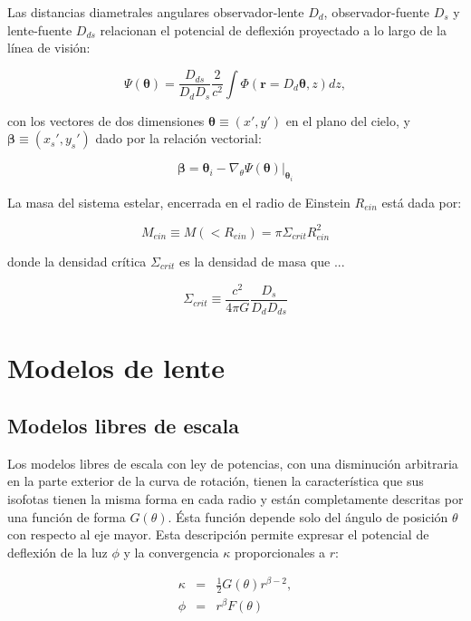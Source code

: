 Las distancias diametrales angulares observador-lente $D_d$, observador-fuente $D_s$ y lente-fuente $D_{ds}$ relacionan el potencial de deflexión proyectado a lo largo de la línea de visión:

\begin{equation}
\Psi ( \bm{\theta}) = \frac{D_{ds}}{D_{d} D_{s}} \frac{2}{c^2} \int \Phi ( \bm{r} = D_d \bm{\theta}, z) dz,
\end{equation}

con los vectores de dos dimensiones $\bm{\theta} \equiv (x', y')$ en el plano del cielo, y $\bm{\beta} \equiv (x_s', y_s')$ dado por la relación vectorial:

\begin{equation}
\bm{\beta} = \bm{\theta}_i - \nabla_{\theta} \Psi (\bm{\theta}) |_{\bm{\theta}_i}
\end{equation}


La masa del sistema estelar, encerrada en el radio de Einstein $R_{ein}$ está dada por:

\begin{equation}
M_{ein} \equiv M(<R_{ein}) = \pi \Sigma_{crit}R_{ein}^2
\end{equation}

donde la densidad crítica $\Sigma_{crit}$ es la densidad de masa que ...

\begin{equation}
\Sigma_{crit} \equiv \frac{c^2}{4 \pi G} \frac{D_s}{D_d D_{ds}}
\end{equation}


\section{Modelos de lente}

\subsection{Modelos libres de escala}

Los modelos libres de escala con ley de potencias, con una disminución arbitraria en la parte exterior de la curva de rotación, tienen la característica que sus isofotas tienen la misma forma en cada radio y están completamente descritas por una función de forma $G(\theta)$. Ésta función depende solo del ángulo de posición $\theta$ con respecto al eje mayor. Esta descripción permite expresar el potencial de deflexión de la luz $\phi$ y la convergencia $\kappa$ proporcionales a $r$:

\begin{eqnarray}
\kappa &=& \frac{1}{2} G(\theta) r^{\beta-2}, \\
\phi &=& r^{\beta} F(\theta)
\end{eqnarray}

